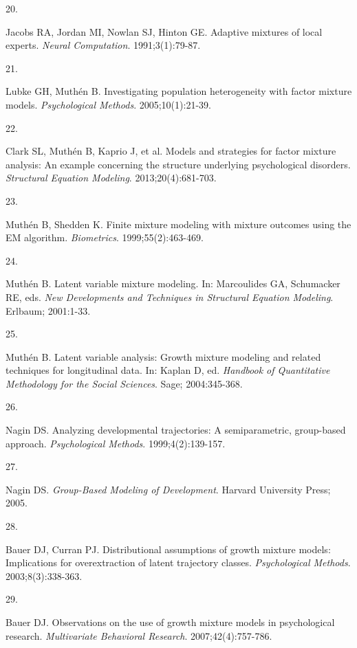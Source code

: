 \documentclass[
  11pt,
]{article}
\newlength{\cslhangindent}
\newlength{\csllabelwidth}
\newenvironment{CSLReferences}[2] %
 {\begin{list}{}{%
  \setlength{\itemindent}{0pt}
  \setlength{\leftmargin}{0pt}
  \setlength{\parsep}{0pt}
  \ifodd #1
   \setlength{\leftmargin}{\cslhangindent}
   \setlength{\itemindent}{-1\cslhangindent}
  \fi
  \setlength{\itemsep}{#2\baselineskip}}}
 {\end{list}}
\newcommand{\CSLLeftMargin}[1]{\parbox[t]{\csllabelwidth}{\strut#1\strut}}
\newcommand{\CSLRightInline}[1]{\parbox[t]{\linewidth - \csllabelwidth}{\strut#1\strut}}
\begin{document}
\begin{CSLReferences}{0}{1}
\CSLLeftMargin{20. }%
\CSLRightInline{Jacobs RA, Jordan MI, Nowlan SJ, Hinton GE. Adaptive mixtures of local experts. \emph{Neural Computation}. 1991;3(1):79-87.}

\CSLLeftMargin{21. }%
\CSLRightInline{Lubke GH, Muthén B. Investigating population heterogeneity with factor mixture models. \emph{Psychological Methods}. 2005;10(1):21-39.}

\CSLLeftMargin{22. }%
\CSLRightInline{{Clark SL, Muthén B, Kaprio J, et al.} Models and strategies for factor mixture analysis: An example concerning the structure underlying psychological disorders. \emph{Structural Equation Modeling}. 2013;20(4):681-703.}

\CSLLeftMargin{23. }%
\CSLRightInline{Muthén B, Shedden K. Finite mixture modeling with mixture outcomes using the {EM} algorithm. \emph{Biometrics}. 1999;55(2):463-469.}

\CSLLeftMargin{24. }%
\CSLRightInline{Muthén B. Latent variable mixture modeling. In: Marcoulides GA, Schumacker RE, eds. \emph{New Developments and Techniques in Structural Equation Modeling}. Erlbaum; 2001:1-33.}

\CSLLeftMargin{25. }%
\CSLRightInline{Muthén B. Latent variable analysis: Growth mixture modeling and related techniques for longitudinal data. In: Kaplan D, ed. \emph{Handbook of Quantitative Methodology for the Social Sciences}. Sage; 2004:345-368.}

\CSLLeftMargin{26. }%
\CSLRightInline{Nagin DS. Analyzing developmental trajectories: A semiparametric, group-based approach. \emph{Psychological Methods}. 1999;4(2):139-157.}

\CSLLeftMargin{27. }%
\CSLRightInline{Nagin DS. \emph{Group-Based Modeling of Development}. Harvard University Press; 2005.}

\CSLLeftMargin{28. }%
\CSLRightInline{Bauer DJ, Curran PJ. Distributional assumptions of growth mixture models: Implications for overextraction of latent trajectory classes. \emph{Psychological Methods}. 2003;8(3):338-363.}

\CSLLeftMargin{29. }%
\CSLRightInline{Bauer DJ. Observations on the use of growth mixture models in psychological research. \emph{Multivariate Behavioral Research}. 2007;42(4):757-786.}


\end{CSLReferences}
\end{document}
